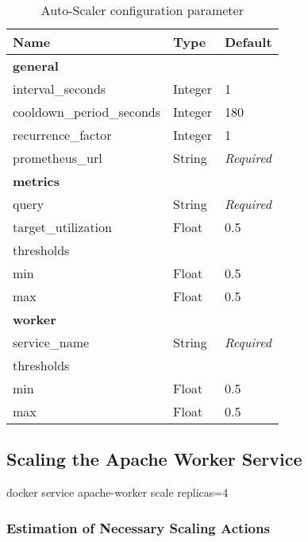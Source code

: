 \begin{table}[]
\centering
\begin{tabular}{@{}lll@{}}
\toprule
Name                      & Type    & Default           \\ \midrule
\multicolumn{3}{l}{\textbf{general}}                    \\ \midrule
interval\_seconds         & Integer & 1                 \\
cooldown\_period\_seconds & Integer & 180               \\
recurrence\_factor        & Integer & 1                 \\
prometheus\_url           & String  & \textit{Required} \\
\multicolumn{3}{l}{\textbf{metrics}}                    \\ \midrule
query                     & String  & \textit{Required} \\
target\_utilization       & Float   & 0.5               \\
\multicolumn{3}{l}{thresholds}                          \\
min                       & Float   & 0.5               \\
max                       & Float   & 0.5               \\
\multicolumn{3}{l}{\textbf{worker}}                     \\ \midrule
service\_name             & String  & \textit{Required} \\
\multicolumn{3}{l}{thresholds}                          \\
min                       & Float   & 0.5               \\
max                       & Float   & 0.5               \\ \bottomrule
\end{tabular}
\caption{Auto-Scaler configuration parameter}
\label{table:06_auto-scaler_config_parameter}
\end{table}


\subsection{Scaling the Apache Worker Service}
docker service apache-worker scale replicas=4


\subsubsection{Estimation of Necessary Scaling Actions}

